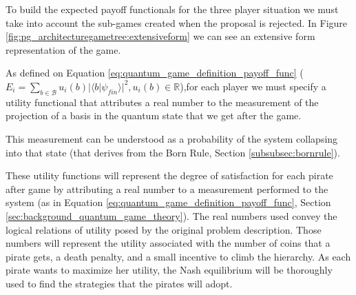 To build the expected payoff functionals for the three player situation we must take into account the sub-games created when the proposal is rejected. In Figure \ref{fig:pg_architecturegametree:extensiveform} we can see an extensive form representation of the game.

As defined on Equation \ref{eq:quantum_game_definition_payoff_func} ($ E_{i}=\sum_{b \in \mathcal{B}} u_{i}(b)\vert \langle b\vert \psi_{fin}\rangle\vert^{2}, u_{i}(b) \in \mathbb{R} $),for each player we must specify a utility functional that attributes a real number to the measurement of the projection of a basis in the quantum state that we get after the game. 


This measurement can be understood as a probability of the system collapsing into that state (that derives from the Born Rule, Section \ref{subsubsec:bornrule}).


These utility functions will represent the degree of satisfaction for each pirate after game by attributing a real number to a measurement performed to the system (as in Equation \ref{eq:quantum_game_definition_payoff_func}, Section \ref{sec:background_quantum_game_theory}). 
The real numbers used convey the logical relations of utility posed by the original problem description. Those numbers will represent the utility associated with the number of coins that a pirate gets, a death penalty, and a small incentive to climb the hierarchy. As each pirate wants to maximize her utility, the Nash equilibrium will be thoroughly used to find the strategies that the pirates will adopt\cite{nash50}\cite{Nash51}.





